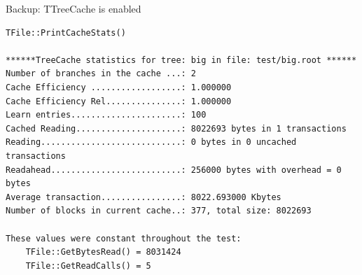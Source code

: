 \documentclass{beamer}
\begin{document}
\begin{frame}[fragile]{Backup: TTreeCache is enabled}
\scriptsize
\begin{lstlisting}
TFile::PrintCacheStats()

******TreeCache statistics for tree: big in file: test/big.root ******
Number of branches in the cache ...: 2
Cache Efficiency ..................: 1.000000
Cache Efficiency Rel...............: 1.000000
Learn entries......................: 100
Cached Reading.....................: 8022693 bytes in 1 transactions
Reading............................: 0 bytes in 0 uncached transactions
Readahead..........................: 256000 bytes with overhead = 0 bytes
Average transaction................: 8022.693000 Kbytes
Number of blocks in current cache..: 377, total size: 8022693

These values were constant throughout the test:
    TFile::GetBytesRead() = 8031424
    TFile::GetReadCalls() = 5
\end{lstlisting}
\end{frame}
\end{document}
